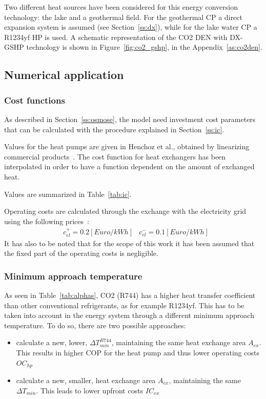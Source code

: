 \documentclass{article}
\begin{document}
Two different heat sources have been considered for this energy conversion technology: the lake and a geothermal field. For the geothermal CP a direct expansion system is assumed (see Section~\ref{ss:dx}), while for the lake water CP a R1234yf HP is used. A schematic representation of the CO2 DEN with DX-GSHP technology is shown in Figure~\ref{fig:co2_gshp}, in the Appendix~\ref{as:co2den}.

\subsection{Numerical application}

\subsubsection{Cost functions}

As described in Section~\ref{ss:osmose}, the model need investment cost parameters that can be calculated with the procedure explained in Section~\ref{ss:ic}.

Values for the heat pumps are given in Henchoz et al., obtained by linearizing commercial products~\cite{henchozPerformanceProfitabilityPerspectives2015}. The cost function for heat exchangers has been interpolated in order to have a function dependent on the amount of exchanged heat.

Values are summarized in Table~\ref{tab:ic}.



Operating costs are calculated through the exchange with the electricity grid using the following prices~\cite{StrompreisWebseiteElComVergleichen}:
\begin{align}
	& c_{el}^{+} = 0.2 [Euro/kWh]
	& c_{el}^{-} = 0.1 [Euro/kWh]
\end{align}
It has also to be noted that for the scope of this work it has been assumed that the fixed part of the operating costs is negligible.

\subsubsection{Minimum approach temperature}
As seen in Table~\ref{tab:alphas}, CO2 (R744) has a higher heat transfer coefficient than other conventional refrigerants, as for example R1234yf. This has to be taken into account in the energy system through a different minimum approach temperature. To do so, there are two possible approaches:
\begin{itemize}
	\item calculate a new, lower, $\Delta T_{min}^{R744}$, maintaining the same heat exchange area $A_{ex}$. This results in higher COP for the heat pump and thus lower operating costs $OC_{hp}$
	\item calculate a new, smaller, heat exchange area  $A_{ex}$, maintaining the same $\Delta T_{min}$. This leads to lower upfront costs $IC_{ex}$
\end{itemize}
\end{document}
